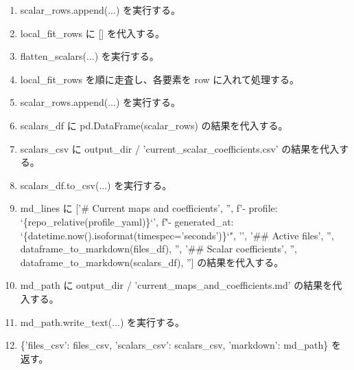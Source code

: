 \documentclass[a4paper,11pt]{article}
\begin{document}
\begin{enumerate}[leftmargin=1.8em]
\item     scalar\_rows.append(...) を実行する。
\item local\_fit\_rows に [] を代入する。
\item flatten\_scalars(...) を実行する。
\item local\_fit\_rows を順に走査し、各要素を row に入れて処理する。
\item   scalar\_rows.append(...) を実行する。
\item scalars\_df に pd.DataFrame(scalar\_rows) の結果を代入する。
\item scalars\_csv に output\_dir / 'current\_scalar\_coefficients.csv' の結果を代入する。
\item scalars\_df.to\_csv(...) を実行する。
\item md\_lines に ['\# Current maps and coefficients', '', f'- profile: `\{repo\_relative(profile\_yaml)\}`', f"- generated\_at: `\{datetime.now().isoformat(timespec='seconds')\}`", '', '\#\# Active files', '', dataframe\_to\_markdown(files\_df), '', '\#\# Scalar coefficients', '', dataframe\_to\_markdown(scalars\_df), ''] の結果を代入する。
\item md\_path に output\_dir / 'current\_maps\_and\_coefficients.md' の結果を代入する。
\item md\_path.write\_text(...) を実行する。
\item \{'files\_csv': files\_csv, 'scalars\_csv': scalars\_csv, 'markdown': md\_path\} を返す。
            \end{enumerate}
\end{document}
